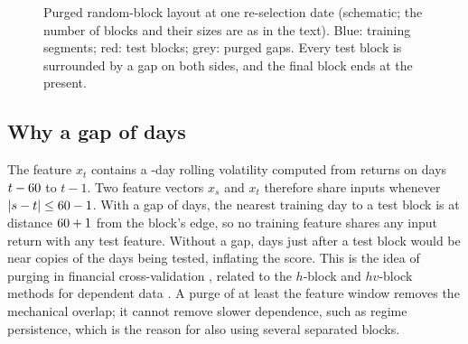 \documentclass[11pt]{article}
\begin{document}
\begin{figure}[H]
\centering
{}
\caption{Purged random-block layout at one re-selection date (schematic; the number of blocks and their sizes are as in the text). Blue: training segments; red: test blocks; grey: purged gaps. Every test block is surrounded by a gap on both sides, and the final block ends at the present.}
\label{fig:layout}
\end{figure}

\subsection{Why a gap of \GapDays{} days}

The feature $x_t$ contains a \VolWindow{}-day rolling volatility computed from returns on days $t-60{}$ to $t-1$. Two feature vectors $x_s$ and $x_t$ therefore share inputs whenever $|s-t|\le 60{}-1$. With a gap of \GapDays{} days, the nearest training day to a test block is at distance $60{}+1$ from the block's edge, so no training feature shares any input return with any test feature. Without a gap, days just after a test block would be near copies of the days being tested, inflating the score. This is the idea of purging in financial cross-validation \cite{lopezdeprado2018}, related to the $h$-block and $hv$-block methods for dependent data \cite{racine2000}. A purge of at least the feature window removes the mechanical overlap; it cannot remove slower dependence, such as regime persistence, which is the reason for also using several separated blocks.
\end{document}
